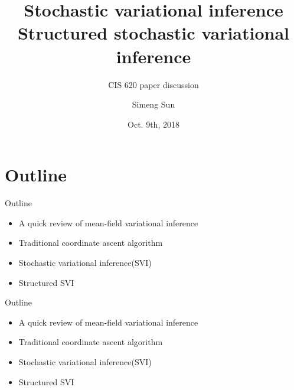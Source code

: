 \documentclass[aspectratio=169]{beamer}
\title[]{Stochastic variational inference \\ Structured stochastic variational inference}
\subtitle{CIS 620 paper discussion}
\author{Simeng Sun}
\date{Oct. 9th, 2018}
\newenvironment{greytext}{\color{gray}}{\ignorespacesafterend}
\begin{document}
\begin{frame}
  \titlepage
\end{frame}



\section{Outline}

\begin{frame}{Outline}

    \begin{itemize}
      \item A quick review of mean-field variational inference
      \item Traditional coordinate ascent algorithm
      \item Stochastic variational inference(SVI)
      \item Structured SVI
    \end{itemize}
    

\end{frame}

\begin{frame}{Outline}

    \begin{itemize}
      \item A quick review of mean-field variational inference
      \begin{greytext}
      \item Traditional coordinate ascent algorithm
      \item Stochastic variational inference(SVI)
      \item Structured SVI
      \end{greytext}
    \end{itemize}

\end{frame}
\end{document}
